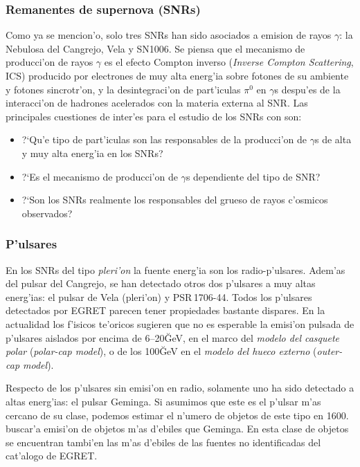 \subsubsection*{Remanentes de supernova (SNRs)}
% 
Como ya se mencion'o, solo tres SNRs han sido asociados a emision de
rayos $\gamma$: la Nebulosa del Cangrejo, Vela y SN1006. Se piensa que
el mecanismo de producci'on de rayos $\gamma$ es el efecto Compton
inverso (\emph{Inverse Compton Scattering}, ICS) producido por
electrones de muy alta energ'ia sobre fotones de su ambiente y fotones
sincrotr'on, y la desintegraci'on de part'iculas $\pi^0$ en $\gamma$s
despu'es de la interacci'on de hadrones acelerados con la materia
externa al SNR. Las principales cuestiones de inter'es para el estudio
de los SNRs con \MAGIC son:
%
\begin{itemize}
\item ?`Qu'e tipo de part'iculas son las responsables de la
  producci'on de $\gamma$s de alta y muy alta energ'ia en los SNRs?
%
\item ?`Es el mecanismo de producci'on de $\gamma$s dependiente del
  tipo de SNR?
%
\item ?`Son los SNRs realmente los responsables del grueso de rayos
  c'osmicos observados?
\end{itemize}

\subsubsection*{P'ulsares} 
%
En los SNRs del tipo \emph{pleri'on} la fuente energ'ia son los
radio-p'ulsares. Adem'as del pulsar del Cangrejo, se han detectado
otros dos p'ulsares a muy altas energ'ias: el pulsar de Vela
(pleri'on) y PSR\,1706-44. Todos los p'ulsares detectados por EGRET
parecen tener propiedades bastante dispares. En la actualidad los
f'isicos te'oricos sugieren que no es esperable la emisi'on pulsada de
p'ulsares aislados por encima de 6--20\u{GeV}, en el marco del
\emph{modelo del casquete polar} (\emph{polar-cap model}), o de los
100\u{GeV} en el \emph{modelo del hueco externo} (\emph{outer-cap
model}). 

Respecto de los p'ulsares sin emisi'on en radio, solamente uno ha sido
detectado a altas energ'ias: el pulsar Geminga. Si asumimos que este
es el p'ulsar m'as cercano de su clase, podemos estimar el n'umero de
objetos de este tipo en 1600. \MAGIC buscar'a emisi'on de objetos m'as
d'ebiles que Geminga. En esta clase de objetos se encuentran tambi'en
las m'as d'ebiles de las fuentes no identificadas del cat'alogo de
EGRET.

